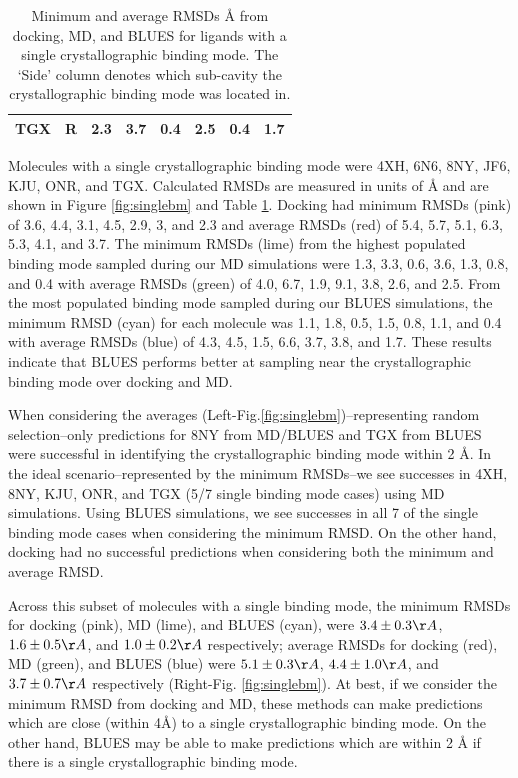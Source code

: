 \begin{table}[]
\begin{tabular}{|l|l|l|l|l|l|l|l|}
\textbf{TGX}                           & R                                    & 2.3                                     & 3.7                                     & 0.4                                   & 2.5                                   & 0.4                                      & 1.7                                      \\ \hline
\end{tabular}
\caption[Single Binding Mode RMSDs]{Minimum and average RMSDs {\AA} from docking, MD, and BLUES for ligands with a single crystallographic binding mode. The `Side' column denotes which sub-cavity the crystallographic binding mode was located in.}
\label{table:singlebm}
\end{table}

Molecules with a single crystallographic binding mode were 4XH, 6N6, 8NY, JF6, KJU, ONR, and TGX.
Calculated RMSDs are measured in units of {\AA} and are shown in Figure \ref{fig:singlebm} and Table \ref{table:singlebm}.
Docking had minimum RMSDs (pink) of 3.6, 4.4, 3.1, 4.5, 2.9, 3, and 2.3 and average RMSDs (red) of 5.4, 5.7, 5.1, 6.3, 5.3, 4.1, and 3.7.
The minimum RMSDs (lime) from the highest populated binding mode sampled during our MD simulations were 1.3, 3.3, 0.6, 3.6, 1.3, 0.8, and 0.4 with average RMSDs (green) of 4.0, 6.7, 1.9, 9.1, 3.8, 2.6, and 2.5.
From the most populated binding mode sampled during our BLUES simulations, the minimum RMSD (cyan) for each molecule was 1.1, 1.8, 0.5, 1.5, 0.8, 1.1, and 0.4 with average RMSDs (blue) of 4.3, 4.5, 1.5, 6.6, 3.7, 3.8, and 1.7.
These results indicate that BLUES performs better at sampling near the crystallographic binding mode over docking and MD.

When considering the averages (Left-Fig.\ref{fig:singlebm})--representing random selection--only predictions for 8NY from MD/BLUES and TGX from BLUES were successful in identifying the crystallographic binding mode within 2 {\AA}.
In the ideal scenario--represented by the minimum RMSDs--we see successes in 4XH, 8NY, KJU, ONR, and TGX (5/7 single binding mode cases) using MD simulations.
Using BLUES simulations, we see successes in all 7 of the single binding mode cases when considering the minimum RMSD.
On the other hand, docking had no successful predictions when considering both the minimum and average RMSD.

Across this subset of molecules with a single binding mode, the minimum RMSDs for docking (pink), MD (lime), and BLUES (cyan), were $3.4 \pm 0.3 {\AA}$, $1.6 \pm 0.5 {\AA}$, and $1.0 \pm 0.2 {\AA}$ respectively; average RMSDs for docking (red), MD (green), and BLUES (blue) were $5.1 \pm 0.3 {\AA}$, $4.4 \pm 1.0 {\AA}$, and $3.7 \pm 0.7 {\AA}$ respectively (Right-Fig. \ref{fig:singlebm}).
At best, if we consider the minimum RMSD from docking and MD, these methods can make predictions which are close (within 4{\AA}) to a single crystallographic binding mode.
On the other hand, BLUES may be able to make predictions which are within 2 {\AA} if there is a single crystallographic binding mode.

